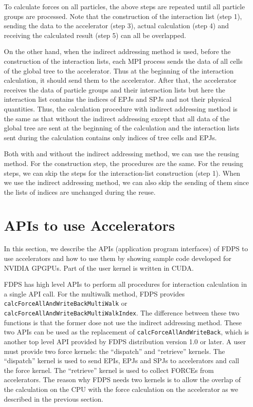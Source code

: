 \documentclass[dvipdfmx]{pasj01}
\begin{document}
To calculate forces on all particles, the above steps are repeated
until all particle groups are processed. Note that the construction of
the interaction list (step 1), sending the data to the accelerator
(step 3), actual calculation (step 4) and receiving the calculated
result (step 5) can all be overlapped.

On the other hand, when the indirect addressing method is used, before
the construction of the interaction lists, each MPI process sends the
data of all cells of the global tree to the accelerator. Thus at the
beginning of the interaction calculation, it should send them to the
accelerator. After that, the accelerator receives the data of particle
groups and their interaction lists but here the interaction list
contains the indices of EPJs and SPJs and not their physical
quantities.  Thus, the calculation procedure with indirect addressing
method is the same as that without the indirect addressing except that
all data of the global tree are sent at the beginning of the
calculation and the interaction lists sent during the calculation
contains only indices of tree cells and EPJs.

Both with and without the indirect addressing method, we can use the
reusing method. For the construction step, the procedures are the
same. For the reusing steps, we can skip the steps for the
interaction-list construction (step 1).  When we use the indirect
addressing method, we can also skip the sending of them since the
lists of indices are unchanged during the reuse.



\section{APIs to use Accelerators}
\label{sec:api}

In this section, we describe the APIs (application program interfaces)
of FDPS to use accelerators and how to use them by showing sample code
developed for NVIDIA GPGPUs. Part of the user kernel is written in
CUDA.

FDPS has high level APIs to perform all procedures for interaction
calculation in a single API call. For the multiwalk method, FDPS
provides {\tt calcForceAllAndWriteBackMultiWalk} or {\tt
  calcForceAllAndWriteBackMultiWalkIndex}. The difference between
these two functions is that the former dose not use the indirect
addressing method. These two APIs can be used as the replacement of
{\tt calcForceAllAndWriteBack}, which is another top level API
provided by FDPS distribution version 1.0 or later. A user must
provide two force kernels: the ``dispatch'' and ``retrieve''
kernels. The ``dispatch'' kernel is used to send EPIs, EPJs and SPJs
to accelerators and call the force kernel. The ``retrieve'' kernel is
used to collect FORCEs from accelerators. The reason why FDPS needs
two kernels is to allow the overlap of the calculation on the CPU with
the force calculation on the accelerator as we described in the
previous section.
\end{document}
